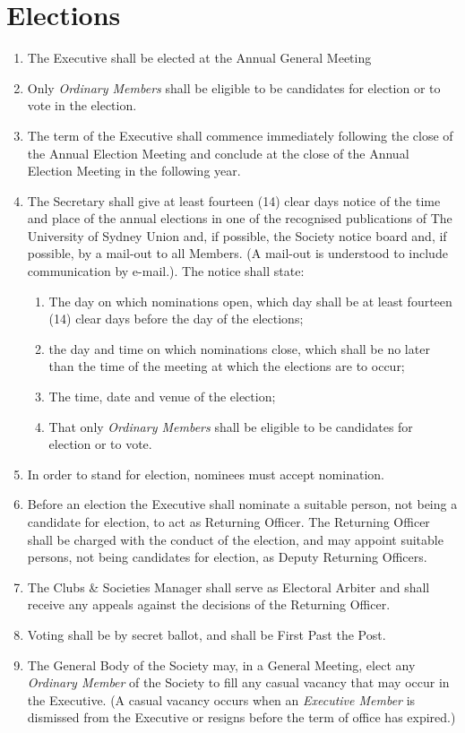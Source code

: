 \documentclass[11pt]{article}
\begin{document}
\section{Elections}
\begin{enumerate}[\thesection .1]
    \item The Executive shall be elected at the Annual General Meeting 
    \item Only \textit{Ordinary Members} shall be eligible to be candidates for election or to vote in the election.
    \item The term of the Executive shall commence immediately following the close of the Annual Election Meeting and conclude at the close of the Annual Election Meeting in the following year.
    \item The Secretary shall give at least fourteen (14) clear days notice of the time and place of the annual elections in one of the recognised publications of The University of Sydney Union and, if possible, the Society notice board and, if possible, by a mail-out to all Members. (A mail-out is understood to include communication by e-mail.).  The notice shall state:
    \begin{enumerate}[\hspace{5mm}1.]
        \item The day on which nominations open, which day shall be at least fourteen (14) clear days before the day of the elections;
        \item  the day and time on which nominations close, which shall be no later than the time of the meeting at which the elections are to occur;
        \item The time, date and venue of the election;
        \item That only \textit{Ordinary Members} shall be eligible to be candidates for election or to vote.
    \end{enumerate}
    \item In order to stand for election, nominees must accept nomination.
    \item Before an election the Executive shall nominate a suitable person, not being a candidate for election, to act as Returning Officer. The Returning Officer shall be charged with the conduct of the election, and may appoint suitable persons, not being candidates for election, as Deputy Returning Officers.
    \item The Clubs \& Societies Manager shall serve as Electoral Arbiter and shall receive any appeals against the decisions of the Returning Officer.
    \item Voting shall be by secret ballot, and shall be First Past the Post.
    \item The General Body of the Society may, in a General Meeting, elect any \textit{Ordinary Member} of the Society to fill any casual vacancy that may occur in the Executive. (A casual vacancy occurs when an \textit{Executive Member} is dismissed from the Executive or resigns before the term of office has expired.)
\end{enumerate}
\end{document}
